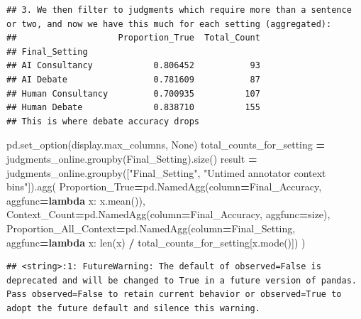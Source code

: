 \documentclass[
]{article}
\newenvironment{Shaded}{\begin{snugshade}}{\end{snugshade}}
\newcommand{\BuiltInTok}[1]{#1}
\newcommand{\KeywordTok}[1]{\textcolor[rgb]{0.13,0.29,0.53}{\textbf{#1}}}
\newcommand{\NormalTok}[1]{#1}
\newcommand{\OperatorTok}[1]{\textcolor[rgb]{0.81,0.36,0.00}{\textbf{#1}}}
\newcommand{\StringTok}[1]{\textcolor[rgb]{0.31,0.60,0.02}{#1}}
\newcommand{\VariableTok}[1]{\textcolor[rgb]{0.00,0.00,0.00}{#1}}
\begin{document}
\begin{verbatim}
## 3. We then filter to judgments which require more than a sentence or two, and now we have this much for each setting (aggregated):
##                    Proportion_True  Total_Count
## Final_Setting                                  
## AI Consultancy            0.806452           93
## AI Debate                 0.781609           87
## Human Consultancy         0.700935          107
## Human Debate              0.838710          155
## This is where debate accuracy drops
\end{verbatim}

\begin{Shaded}
\begin{Highlighting}[]
\NormalTok{pd.set\_option(}\StringTok{\textquotesingle{}display.max\_columns\textquotesingle{}}\NormalTok{, }\VariableTok{None}\NormalTok{)}
\NormalTok{total\_counts\_for\_setting }\OperatorTok{=}\NormalTok{ judgments\_online.groupby(}\StringTok{\textquotesingle{}Final\_Setting\textquotesingle{}}\NormalTok{).size()}
\NormalTok{result }\OperatorTok{=}\NormalTok{ judgments\_online.groupby([}\StringTok{"Final\_Setting"}\NormalTok{, }\StringTok{"Untimed annotator context bins"}\NormalTok{]).agg(}
\NormalTok{    Proportion\_True}\OperatorTok{=}\NormalTok{pd.NamedAgg(column}\OperatorTok{=}\StringTok{\textquotesingle{}Final\_Accuracy\textquotesingle{}}\NormalTok{, aggfunc}\OperatorTok{=}\KeywordTok{lambda}\NormalTok{ x: x.mean()),}
\NormalTok{    Context\_Count}\OperatorTok{=}\NormalTok{pd.NamedAgg(column}\OperatorTok{=}\StringTok{\textquotesingle{}Final\_Accuracy\textquotesingle{}}\NormalTok{, aggfunc}\OperatorTok{=}\StringTok{\textquotesingle{}size\textquotesingle{}}\NormalTok{),}
\NormalTok{    Proportion\_All\_Context}\OperatorTok{=}\NormalTok{pd.NamedAgg(column}\OperatorTok{=}\StringTok{\textquotesingle{}Final\_Setting\textquotesingle{}}\NormalTok{, aggfunc}\OperatorTok{=}\KeywordTok{lambda}\NormalTok{ x: }\BuiltInTok{len}\NormalTok{(x) }\OperatorTok{/}\NormalTok{ total\_counts\_for\_setting[x.mode()])}
\NormalTok{)}
\end{Highlighting}
\end{Shaded}

\begin{verbatim}
## <string>:1: FutureWarning: The default of observed=False is deprecated and will be changed to True in a future version of pandas. Pass observed=False to retain current behavior or observed=True to adopt the future default and silence this warning.
\end{verbatim}
\end{document}

